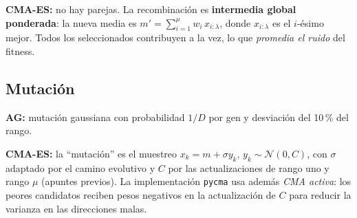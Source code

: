 \documentclass[apuntes]{uc3mmaster}
\begin{document}
\textbf{CMA-ES:} no hay parejas. La recombinación es \textbf{intermedia global ponderada}: la nueva media es
$m'=\sum_{i=1}^{\mu}w_i\,x_{i:\lambda}$, donde $x_{i:\lambda}$ es el $i$-ésimo mejor. Todos los seleccionados
contribuyen a la vez, lo que \emph{promedia el ruido} del fitness.

\subsection{Mutación}
\textbf{AG:} mutación gaussiana con probabilidad $1/D$ por gen y desviación del 10\,\% del rango.

\textbf{CMA-ES:} la ``mutación'' es el muestreo $x_k=m+\sigma y_k$, $y_k\sim\mathcal N(0,C)$, con $\sigma$ adaptado
por el camino evolutivo y $C$ por las actualizaciones de rango uno y rango $\mu$ (apuntes previos). La implementación
\texttt{pycma} usa además \emph{CMA activa}: los peores candidatos reciben pesos negativos en la actualización de $C$
para reducir la varianza en las direcciones malas.
\end{document}
